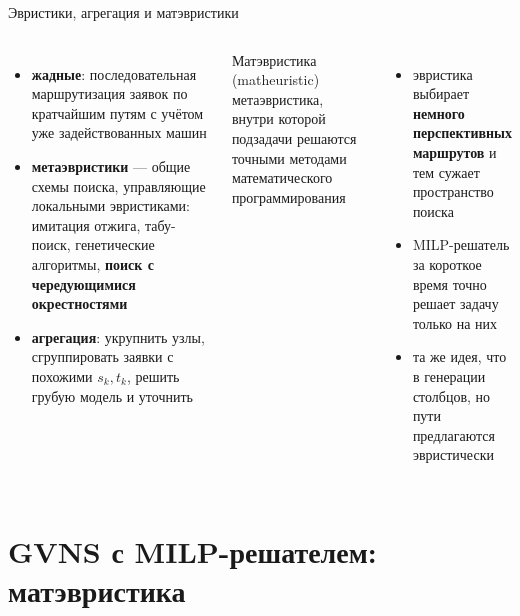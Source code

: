\documentclass[aspectratio=169,10pt]{beamer}
\begin{document}
\begin{frame}{Эвристики, агрегация и матэвристики}
\begin{columns}[T]
\begin{itemize}\setlength{\itemsep}{4pt}
\item \textbf{жадные}: последовательная маршрутизация заявок по кратчайшим путям с учётом уже задействованных машин
\item \textbf{метаэвристики} --- общие схемы поиска, управляющие локальными эвристиками: имитация отжига, табу-поиск, генетические алгоритмы, \textbf{поиск с чередующимися окрестностями}
\item \textbf{агрегация}: укрупнить узлы, сгруппировать заявки с похожими $s_k,t_k$, решить грубую модель и уточнить
\end{itemize}
\begin{block}{Матэвристика (matheuristic)}
метаэвристика, внутри которой подзадачи решаются точными методами математического программирования
\end{block}
\begin{itemize}
\item эвристика выбирает \textbf{немного перспективных маршрутов} и тем сужает пространство поиска
\item MILP-решатель за короткое время точно решает задачу только на них
\item та же идея, что в генерации столбцов, но пути предлагаются эвристически
\end{itemize}
\end{columns}
\end{frame}

\section{GVNS с MILP-решателем: матэвристика}
\end{document}
